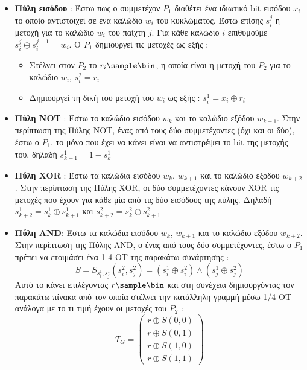 \begin{itemize}
    \item \textbf{Πύλη εισόδου} : Έστω πως ο συμμετέχον $P_1$ διαθέτει ένα ιδιωτικό bit εισόδου $x_i$ το οποίο αντιστοιχεί σε ένα καλώδιο $w_i$ του κυκλώματος. Έστω επίσης $s_i^j$ η μετοχή για το καλώδιο $w_i$ του παίχτη $j$. Για κάθε καλώδιο $i$ επιθυμούμε $s_i^j \oplus s_i^{j-1} = w_i$. Ο $P_1$ δημιουργεί τις μετοχές ως εξής :
    \begin{itemize}
        \item Στέλνει στον $P_2$ το $r_i \sample \bin$, η οποία είναι η μετοχή του $P_2$ για το καλώδιο $w_i$, $s_i^2 = r_i$
        \item Δημιουργεί τη δική του μετοχή του $w_i$ ως εξής : $s_i^1 = x_i \oplus r_i$
    \end{itemize}
    \item \textbf{Πύλη NOT} : Έστω το καλώδιο εισόδου $w_k$ και το καλώδιο εξόδου $w_{k+1}$. Στην περίπτωση της Πύλης NOT, ένας από τους δύο συμμετέχοντες (όχι και οι δύο), έστω ο $P_1$, το μόνο που έχει να κάνει είναι να αντιστρέψει το bit της μετοχής του, δηλαδή $s_{k+1}^1 = 1-s_k^1$
    \item \textbf{Πύλη XOR} : Έστω τα καλώδια εισόδου $w_k$, $w_{k+1}$ και το καλώδιο εξόδου $w_{k+2}$. Στην περίπτωση της Πύλης XOR, οι δύο συμμετέχοντες κάνουν XOR τις μετοχές που έχουν για κάθε μία από τις δύο εισόδους της πύλης. Δηλαδή $s_{k+2}^1 = s_{k}^1 \oplus s_{k+1}^1$ και $s_{k+2}^2 = s_k^2 \oplus s_{k+1}^2$
    \item \textbf{Πύλη AND}: Έστω τα καλώδια εισόδου $w_k$, $w_{k+1}$ και το καλώδιο εξόδου $w_{k+2}$. Στην περίπτωση της Πύλης AND, ο ένας από τους δύο συμμετέχοντες, έστω ο $P_1$ πρέπει να ετοιμάσει ένα 1-4 ΟΤ της παρακάτω συνάρτησης :
    $$
    S=S_{s_i^1, s_j^1}\left(s_i^2, s_j^2\right)=\left(s_i^1 \oplus s_i^2\right) \wedge\left(s_j^1 \oplus s_j^2\right)
    $$
    Αυτό το κάνει επιλέγοντας $r \sample \bin$ και στη συνέχεια δημιουργόντας τον παρακάτω πίνακα από τον οποία στέλνει την κατάλληλη γραμμή μέσω 1/4 OT ανάλογα με το τι τιμή έχουν οι μετοχές του $P_2$ :
    $$
    T_G=\left(\begin{array}{l}
                  r \oplus S(0,0) \\
                  r \oplus S(0,1) \\
                  r \oplus S(1,0) \\
                  r \oplus S(1,1)
    \end{array}\right)
    $$
\end{itemize}

